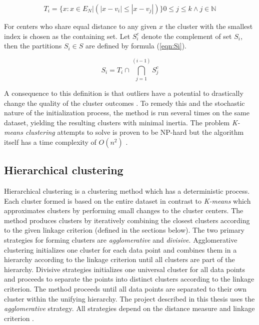 \begin{equation}
\label{eqn:Ti}
T_i = \{x : x \in E_N | (|x - v_i| \leq |x - v_j|)\}  0 \leq j \leq k \wedge j \in \mathbb{N} 
\end{equation}

For centers who share equal distance to any given $x$ the cluster with the smallest index is chosen as the containing set. Let $S_i^c$ denote the complement of set $S_i$, then the partitions $S_i \in S$ are defined by formula (\ref{eqn:Si}).

\begin{equation}
\label{eqn:Si}
S_i = T_i \cap \bigcap_{j=1}^{(i-1)} S_j^c
\end{equation}

A consequence to this definition is that outliers have a potential to drastically change the quality of the cluster outcomes \cite{chawla2013k}. To remedy this and the stochastic nature of the initialization process, the method is run several times on the same dataset, yielding the resulting clusters with minimal inertia. The problem \textit{K-means clustering} attempts to solve is proven to be NP-hard \cite{chawla2013k, mahajan2009planar} but the algorithm itself has a time complexity of $O(n^2)$ \cite{pakhira2014linear}.


\subsection{Hierarchical clustering}

Hierarchical clustering is a clustering method which has a deterministic process. Each cluster formed is based on the entire dataset in contrast to \textit{K-means} which approximates clusters by performing small changes to the cluster centers. The method produces clusters by iteratively combining the closest clusters according to the given linkage criterion (defined in the sections below). The two primary strategies for forming clusters are \textit{agglomerative} and \textit{divisive}. Agglomerative clustering initializes one cluster for each data point and combines them in a hierarchy according to the linkage criterion until all clusters are part of the hierarchy. Divisive strategies initializes one universal cluster for all data points and proceeds to separate the points into distinct clusters according to the linkage criterion. The method proceeds until all data points are separated to their own cluster within the unifying hierarchy. The project described in this thesis uses the \textit{agglomerative} strategy. All strategies depend on the distance measure and linkage criterion \cite{murtagh1983survey}.

